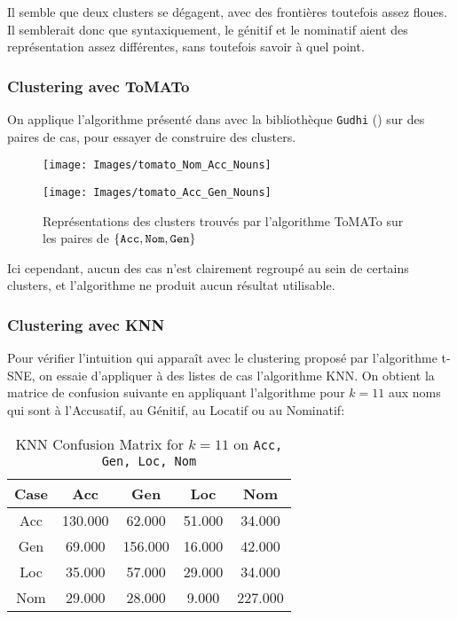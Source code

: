 \documentclass{article}
\begin{document}
Il semble que deux clusters se dégagent, avec des frontières toutefois assez floues.
Il semblerait donc que syntaxiquement, le génitif et le nominatif aient des représentation assez différentes, sans toutefois savoir à quel point.

\subsubsection{Clustering avec ToMATo}\label{subsub:tomato}
On applique l'algorithme présenté dans \cite{ToMATo} avec la bibliothèque \texttt{Gudhi} (\cite{Gudhi}) sur des paires de cas, pour essayer de construire des clusters.
\begin{figure}[h]
\begin{minipage}{.5\textwidth}
        \texttt{[image: Images/tomato\_Nom\_Acc\_Nouns]}
\end{minipage}
\begin{minipage}{.5\textwidth}
        \texttt{[image: Images/tomato\_Acc\_Gen\_Nouns]}
\end{minipage}

\caption{Représentations des clusters trouvés par l'algorithme ToMATo sur les paires de $\{\tt Acc,Nom,Gen\}$}
\end{figure}

Ici cependant, aucun des cas n'est clairement regroupé au sein de certains clusters, et l'algorithme ne produit aucun résultat utilisable.


\subsubsection{Clustering avec KNN}\label{subsub:knn}
Pour vérifier l'intuition qui apparaît avec le clustering proposé par l'algorithme t-SNE, on essaie d'appliquer à des listes de cas l'algorithme KNN.
On obtient la matrice de confusion suivante en appliquant l'algorithme pour $k = 11$ aux noms qui sont à l'Accusatif, au Génitif, au Locatif ou au Nominatif:
\begin{table}[h]
        \centering
        \begin{tabular}{ccccc}
                Case & Acc & Gen & Loc & Nom\\
                \midrule
                Acc & 130.000 & 62.000 & 51.000 & 34.000\\
                Gen & 69.000 & 156.000 & 16.000 & 42.000\\
                Loc & 35.000 & 57.000 & 29.000 & 34.000\\
                Nom & 29.000 & 28.000 & 9.000 & 227.000\\
        \end{tabular}
        \caption{KNN Confusion Matrix for $k = 11$ on \texttt{Acc, Gen, Loc, Nom}}
\end{table}
\end{document}
